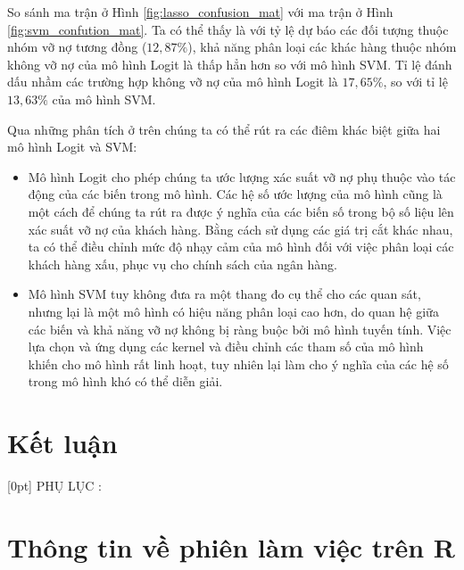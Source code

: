 \documentclass[a4paper]{report}\usepackage[]{graphicx}\usepackage[]{color}
\makeatletter
\newenvironment{kframe}{%
 \def\at@end@of@kframe{}%
 \ifinner\ifhmode%
  \def\at@end@of@kframe{\end{minipage}}%
  \begin{minipage}{\columnwidth}%
 \fi\fi%
 \def\FrameCommand##1{\hskip\@totalleftmargin \hskip-\fboxsep
 \colorbox{shadecolor}{##1}\hskip-\fboxsep
     \hskip-\linewidth \hskip-\@totalleftmargin \hskip\columnwidth}%
 \MakeFramed {\advance\hsize-\width
   \@totalleftmargin\z@ \linewidth\hsize
   \@setminipage}}%
 {\par\unskip\endMakeFramed%
 \at@end@of@kframe}
\newenvironment{knitrout}{}{} %
\makeatother
\begin{document}
So sánh ma trận ở Hình \ref{fig:lasso_confusion_mat} với ma trận ở Hình \ref{fig:svm_confution_mat}. Ta có thể thấy là với tỷ lệ dự báo các đối tượng thuộc nhóm vỡ nợ tương đồng ($12,87\%$), khả năng phân loại các khác hàng thuộc nhóm không vỡ nợ của mô hình Logit là thấp hẳn hơn so với mô hình SVM. Tỉ lệ đánh dấu nhầm các trường hợp không vỡ nợ của mô hình Logit là $17,65\%$, so với tỉ lệ $13,63\%$ của mô hình SVM.

Qua những phân tích ở trên chúng ta có thể rút ra các điêm khác biệt giữa hai mô hình Logit và SVM:
\begin{itemize}
  \item Mô hình Logit cho phép chúng ta ước lượng xác suất vỡ nợ phụ thuộc vào tác động của các biến trong mô hình. Các hệ số ước lượng của mô hình cũng là một cách để chúng ta rút ra được ý nghĩa của các biến số trong bộ số liệu lên xác suất vỡ nợ của khách hàng. Bằng cách sử dụng các giá trị cắt khác nhau, ta có thể điều chỉnh mức độ nhạy cảm của mô hình đối với việc phân loại các khách hàng xấu, phục vụ cho chính sách của ngân hàng.
  \item Mô hình SVM tuy không đưa ra một thang đo cụ thể cho các quan sát, nhưng lại là một mô hình có hiệu năng phân loại cao hơn, do quan hệ giữa các biến và khả năng vỡ nợ không bị ràng buộc bởi mô hình tuyến tính. Việc lựa chọn và ứng dụng các kernel và điều chỉnh các tham số của mô hình khiến cho mô hình rất linh hoạt, tuy nhiên lại làm cho ý nghĩa của các hệ số trong mô hình khó có thể diễn giải.
\end{itemize}


\chapter{Kết luận}

\appendix
{}[0pt]{\bfseries}
  {\color{blue}PHỤ LỤC \thecontentslabel:\quad}
  {}{\contentspage}
  

\chapter{Thông tin về phiên làm việc trên R}

\begin{knitrout}\small
{}\color{fgcolor}\begin{kframe}


{\ttfamily\noindent\bfseries\color{errorcolor}{\#\# Error in system(paste(which, shQuote(names[i])), intern = TRUE, ignore.stderr = TRUE): cannot popen '/usr/bin/which 'uname' 2>/dev/null', probable reason 'Cannot allocate memory'}}\end{kframe}
\end{knitrout}





\printbibliography
{}
\end{document}
